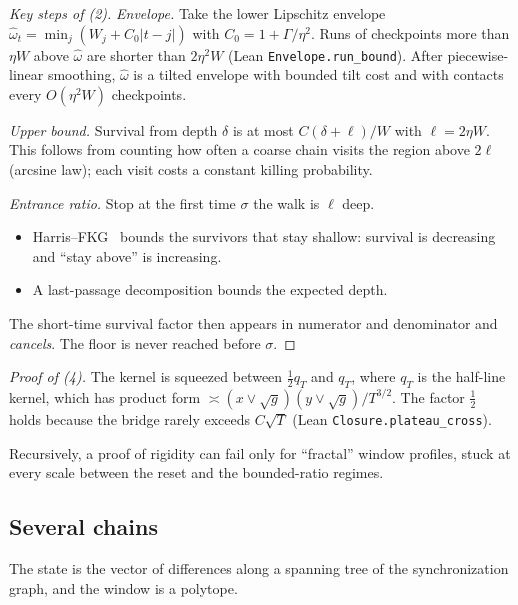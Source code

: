 \documentclass[11pt]{article}
\theoremstyle{definition}
\theoremstyle{remark}
\newcommand{\lean}[1]{\texttt{#1}}
\begin{document}
\begin{proof}[Key steps of (2)]
\emph{Envelope.} Take the lower Lipschitz envelope $\hat\omega_t=\min_j(W_j+C_0|t-j|)$ with $C_0=1+\Gamma/\eta^2$. Runs of checkpoints more than $\eta W$ above $\hat\omega$ are shorter than $2\eta^2W$ (Lean \lean{Envelope.run\_bound}). After piecewise-linear smoothing, $\hat\omega$ is a tilted envelope with bounded tilt cost and with contacts every $O(\eta^2W)$ checkpoints.

\emph{Upper bound.} Survival from depth $\delta$ is at most $C(\delta+\ell)/W$ with $\ell=2\eta W$. This follows from counting how often a coarse chain visits the region above $2\ell$ (arcsine law); each visit costs a constant killing probability.

\emph{Entrance ratio.} Stop at the first time $\sigma$ the walk is $\ell$ deep.
\begin{itemize}
\item Harris--FKG~\cite{Harris60,FKG71} bounds the survivors that stay shallow: survival is decreasing and ``stay above'' is increasing.
\item A last-passage decomposition bounds the expected depth.
\end{itemize}
The short-time survival factor then appears in numerator and denominator and \emph{cancels}. The floor is never reached before $\sigma$.
\end{proof}

\noindent\emph{Proof of (4).} The kernel is squeezed between $\tfrac12q_T$ and $q_T$, where $q_T$ is the half-line kernel, which has product form $\asymp(x\vee\sqrt g)(y\vee\sqrt g)/T^{3/2}$. The factor $\tfrac12$ holds because the bridge rarely exceeds $C\sqrt T$ (Lean \lean{Closure.plateau\_cross}).

\noindent Recursively, a proof of rigidity can fail only for ``fractal'' window profiles, stuck at every scale between the reset and the bounded-ratio regimes.

\subsection{Several chains}

The state is the vector of differences along a spanning tree of the synchronization graph, and the window is a polytope.
\end{document}
